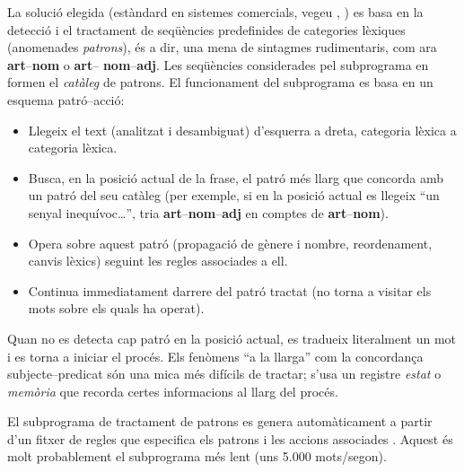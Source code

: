La solució elegida (estàndard en sistemes comercials, vegeu
\citet{mira98j}, \citet{forcada00p}) es basa en la detecció i el
tractament de seqüències predefinides de categories lèxiques
(anomenades \emph{patrons}), és a dir, una mena de sintagmes
rudimentaris, com ara {\bf art}--{\bf nom} o {\bf art}--{\bf
  nom}--{\bf adj}. Les seqüències considerades pel subprograma en
formen el \emph{catàleg} de patrons. El funcionament del subprograma es
basa en un esquema patró--acció:
\begin{itemize}
\item Llegeix el text (analitzat i desambiguat) d'esquerra a dreta,
  categoria lèxica a categoria lèxica.
\item Busca, en la posició actual de la frase, el patró més llarg que
  concorda amb un patró del seu catàleg (per exemple, si en la posició
  actual es llegeix ``un senyal inequívoc\ldots'', tria {\bf
    art}--{\bf nom}--{\bf adj} en comptes de {\bf art}--{\bf nom}).
\item Opera sobre aquest patró (propagació de gènere i nombre,
  reordenament, canvis lèxics) seguint les regles associades a ell.
\item Continua immediatament darrere del patró tractat (no torna a
  visitar els mots sobre els quals ha operat).
\end{itemize}
Quan no es detecta cap patró en la posició actual, es tradueix
literalment un mot i es torna a iniciar el procés.  Els fenòmens ``a
la llarga'' com la concordança subjecte--predicat són una mica més
difícils de tractar; s'usa un registre \emph{estat} o  \emph{memòria}
que recorda certes informacions al llarg del procés.

El subprograma de tractament de patrons es genera automàticament a
partir d'un fitxer de regles que especifica els patrons i les accions
associades \citep{garridoalenda01j}.  Aquest és molt probablement el
subprograma més lent (uns 5.000 mots/segon).


